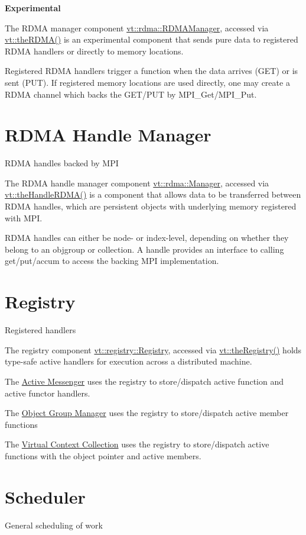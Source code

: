  {\bfseries Experimental}

The R\+D\+MA manager component {\ttfamily \hyperlink{structvt_1_1rdma_1_1_r_d_m_a_manager}{vt\+::rdma\+::\+R\+D\+M\+A\+Manager}}, accessed via {\ttfamily \hyperlink{namespacevt_a68b8410bc2b86d3b5228d7dbb6b40bac}{vt\+::the\+R\+D\+M\+A()}} is an experimental component that sends pure data to registered R\+D\+MA handlers or directly to memory locations.

Registered R\+D\+MA handlers trigger a function when the data arrives (G\+ET) or is sent (P\+UT). If registered memory locations are used directly, one may create a R\+D\+MA channel which backs the G\+E\+T/\+P\+UT by {\ttfamily M\+P\+I\+\_\+\+Get}/{\ttfamily M\+P\+I\+\_\+\+Put}. \hypertarget{rdmahandle}{}\section{R\+D\+MA Handle Manager}\label{rdmahandle}
R\+D\+MA handles backed by M\+PI

The R\+D\+MA handle manager component {\ttfamily \hyperlink{structvt_1_1rdma_1_1_manager}{vt\+::rdma\+::\+Manager}}, accessed via {\ttfamily \hyperlink{namespacevt_aecb87ec2c40b5b7fc57ba4cf8ea838b0}{vt\+::the\+Handle\+R\+D\+M\+A()}} is a component that allows data to be transferred between R\+D\+MA handles, which are persistent objects with underlying memory registered with M\+PI.

R\+D\+MA handles can either be node-\/ or index-\/level, depending on whether they belong to an objgroup or collection. A handle provides an interface to calling get/put/accum to access the backing M\+PI implementation. \hypertarget{registry}{}\section{Registry}\label{registry}
Registered handlers

The registry component {\ttfamily \hyperlink{structvt_1_1registry_1_1_registry}{vt\+::registry\+::\+Registry}}, accessed via {\ttfamily \hyperlink{namespacevt_a8b5994a5aedabc64006ce820db2e938c}{vt\+::the\+Registry()}} holds type-\/safe active handlers for execution across a distributed machine.


\begin{DoxyItemize}
\item The \hyperlink{active-messenger}{Active Messenger} uses the registry to store/dispatch active function and active functor handlers.
\item The \hyperlink{objgroup}{Object Group Manager} uses the registry to store/dispatch active member functions
\item The \hyperlink{collection}{Virtual Context Collection} uses the registry to store/dispatch active functions with the object pointer and active members. 
\end{DoxyItemize}\hypertarget{scheduler}{}\section{Scheduler}\label{scheduler}
General scheduling of work


